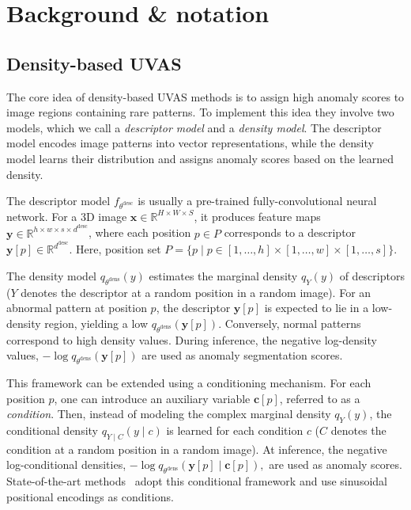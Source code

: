 
\section{Background \& notation}
\label{sec:background}

\subsection{Density-based UVAS}
\label{subsec:framework}

The core idea of density-based UVAS methods is to assign high anomaly scores to image regions containing rare patterns. To implement this idea they involve two models, which we call a \emph{descriptor model} and a \emph{density model}. The descriptor model encodes image patterns into vector representations, while the density model learns their distribution and assigns anomaly scores based on the learned density.

The descriptor model \(f_{\theta^{\text{desc}}}\) is usually a pre-trained fully-convolutional neural network. For a 3D image \(\mathbf{x} \in \mathbb{R}^{H \times W \times S}\), it produces feature maps \(\mathbf{y} \in \mathbb{R}^{h \times w \times s \times d^{\text{desc}}}\), where each position \(p \in P\) corresponds to a descriptor \(\mathbf{y}[p] \in \mathbb{R}^{d^{\text{desc}}}\). Here, position set \(P = \{p \mid p \in [1, \ldots, h] \times [1, \ldots, w] \times [1, \ldots, s]\}\).

The density model \(q_{\theta^{\text{dens}}}(y)\) estimates the marginal density \(q_Y(y)\) of descriptors (\(Y\) denotes the descriptor at a random position in a random image). For an abnormal pattern at position \(p\), the descriptor \(\mathbf{y}[p]\) is expected to lie in a low-density region, yielding a low \(q_{\theta^{\text{dens}}}(\mathbf{y}[p])\). Conversely, normal patterns correspond to high density values. During inference, the negative log-density values,
$-\log q_{\theta^{\text{dens}}}(\mathbf{y}[p])$
are used as anomaly segmentation scores.

This framework can be extended using a conditioning mechanism. For each position \(p\), one can introduce an auxiliary variable \(\mathbf{c}[p]\), referred to as a \emph{condition}. Then, instead of modeling the complex marginal density \(q_Y(y)\), the conditional density \(q_{Y \mid C}(y \mid c)\) is learned for each condition \(c\) (\(C\) denotes the condition at a random position in a random image). At inference, the negative log-conditional densities,
$
-\log q_{\theta^{\text{dens}}}(\mathbf{y}[p] \mid \mathbf{c}[p]),
$
are used as anomaly scores. State-of-the-art methods~\cite{cflow,msflow} adopt this conditional framework and use sinusoidal positional encodings as conditions.

